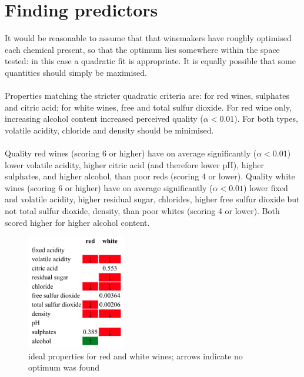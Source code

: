 \documentclass{article}
\begin{document}
\section*{Finding predictors}
It would be reasonable to assume that that winemakers have roughly optimised each chemical present, so that the optimum lies somewhere within the space 
tested: in this case a quadratic fit is appropriate.  It is equally possible that some quantities should simply be maximised.
\\~\\
Properties matching the stricter quadratic criteria are: for red wines, sulphates and citric acid; 
for white wines, free and total sulfur dioxide.  For red wine only, increasing alcohol content increased perceived quality ($\alpha < 0.01$).  
For both types, volatile acidity, chloride and density should be minimised.
\\~\\
Quality red wines (scoring 6 or higher) have on average significantly ($\alpha < 0.01$) lower volatile acidity, higher citric acid (and therefore lower pH),
higher sulphates, and higher alcohol, than poor reds (scoring 4 or lower).\linebreak
Quality white wines (scoring 6 or higher) have on average significantly ($\alpha < 0.01$) lower fixed and volatile acidity, higher residual sugar, chlorides, higher free sulfur dioxide but not total sulfur dioxide, density, than poor whites (scoring 4 or lower).\linebreak
Both scored higher for higher alcohol content.

\begin{figure}[h]
\centering
\includegraphics[height=5.0cm]{figures/recipe.png}
\caption{ideal properties for red and white wines; arrows indicate no optimum was found}
\label{fig:recipe}
\end{figure}
\end{document}
